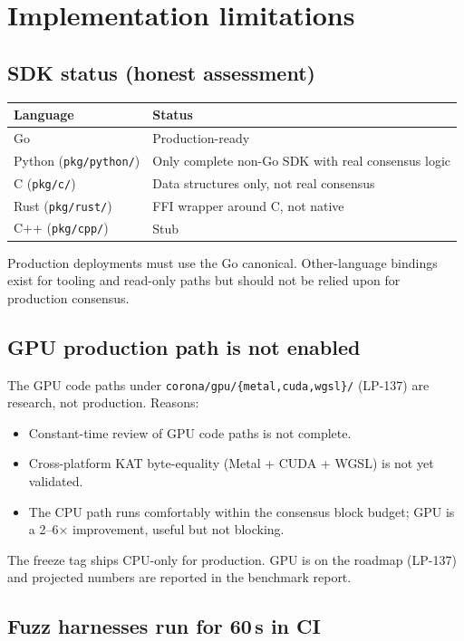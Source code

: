 \documentclass[11pt]{article}
\begin{document}
\section{Implementation limitations}

\subsection{SDK status (honest assessment)}

\begin{longtable}{p{}p{}}
\toprule
\textbf{Language} & \textbf{Status} \\
\midrule
Go & Production-ready \\
Python (\verb|pkg/python/|) & Only complete non-Go SDK with real consensus logic \\
C (\verb|pkg/c/|) & Data structures only, not real consensus \\
Rust (\verb|pkg/rust/|) & FFI wrapper around C, not native \\
C++ (\verb|pkg/cpp/|) & Stub \\
\bottomrule
\end{longtable}

Production deployments must use the Go canonical. Other-language bindings
exist for tooling and read-only paths but should not be relied upon for
production consensus.

\subsection{GPU production path is not enabled}

The GPU code paths under \verb|corona/gpu/{metal,cuda,wgsl}/| (LP-137) are
research, not production. Reasons:

\begin{itemize}
\item Constant-time review of GPU code paths is not complete.
\item Cross-platform KAT byte-equality (Metal + CUDA + WGSL) is not yet
  validated.
\item The CPU path runs comfortably within the consensus block budget; GPU is
  a 2--6$\times$ improvement, useful but not blocking.
\end{itemize}

The freeze tag ships CPU-only for production. GPU is on the roadmap (LP-137)
and projected numbers are reported in the benchmark report.

\subsection{Fuzz harnesses run for 60\,s in CI}
\end{document}
